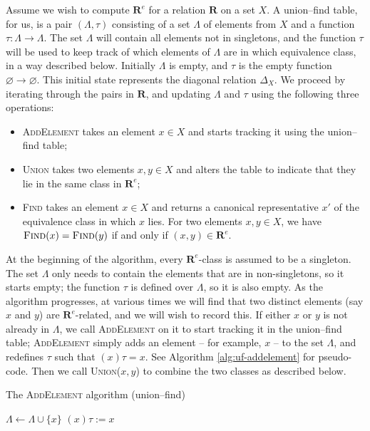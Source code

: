 Assume we wish to compute $\mathbf{R}^e$ for a relation $\mathbf{R}$ on a set
$X$.  A union--find table, for us, is a pair $(\Lambda, \tau)$ consisting of a
set $\Lambda$ of elements from $X$ and a function $\tau: \Lambda \to \Lambda$.
The set $\Lambda$ will contain all elements not in singletons, and the function
$\tau$ will be used to keep track of which elements of $\Lambda$ are in which
equivalence class, in a way described below.  Initially $\Lambda$ is empty, and
$\tau$ is the empty function $\varnothing \to \varnothing$.  This initial state
represents the diagonal relation $\Delta_X$.  We proceed by iterating through
the pairs in $\mathbf{R}$, and updating $\Lambda$ and $\tau$ using the following
three operations:
\begin{itemize}
\item \textsc{AddElement} takes an element $x \in X$ and starts tracking it
  using the union--find table;
\item \textsc{Union} takes two elements $x,y \in X$ and alters the table to
  indicate that they lie in the same class in $\mathbf{R}^e$;
\item \textsc{Find} takes an element $x \in X$ and returns a canonical
  representative $x'$ of the equivalence class in which $x$ lies.  For two
  elements $x, y \in X$, we have $\textsc{Find}(x) = \textsc{Find}(y)$ if and
  only if $(x,y) \in \mathbf{R}^e$.
\end{itemize}

At the beginning of the algorithm, every $\mathbf{R}^e$-class is assumed to be a
singleton.  The set $\Lambda$ only needs to contain the elements that are in non-singletons, so it
starts empty; the function $\tau$ is defined over $\Lambda$, so it is also empty.
As the algorithm progresses,
at various times we will find that two distinct elements (say $x$ and $y$) are
$\mathbf{R}^e$-related, and we will wish to record this.  If either $x$ or
$y$ is not already in $\Lambda$, we call \textsc{AddElement} on it to start tracking
it in the union--find table; \textsc{AddElement} simply adds an element -- for
example, $x$ -- to the set $\Lambda$, and redefines $\tau$ such that $(x)\tau = x$.  See Algorithm
\ref{alg:uf-addelement} for pseudo-code.  Then we call \textsc{Union($x,y$)} to
combine the two classes as described below.

\begin{algorithm}
\caption{The \textsc{AddElement} algorithm (union--find)}
\label{alg:uf-addelement}
  \begin{algorithmic}[1]
      \State $\Lambda \gets \Lambda \cup \{x\}$
      \State $(x)\tau := x$
    \EndProcedure
  \end{algorithmic}
\end{algorithm}


